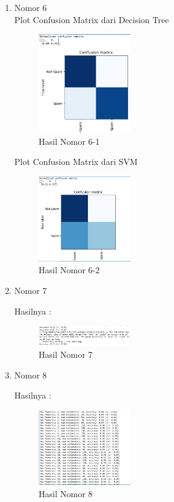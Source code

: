 \begin{enumerate}
\item Nomor 6\\
Plot Confusion Matrix dari Decision Tree
	\begin{figure}[H]
		\includegraphics[width=4cm]{figures/1174053/4/11.png}
		\centering
		\caption{Hasil Nomor 6-1}
	\end{figure}
	
Plot Confusion Matrix dari SVM
\begin{figure}[H]
		\includegraphics[width=4cm]{figures/1174053/4/12.png}
		\centering
		\caption{Hasil Nomor 6-2}
	\end{figure}
	
\item Nomor 7
\hfill\break
	
Hasilnya :
\hfill\break
	\begin{figure}[H]
		\includegraphics[width=4cm]{figures/1174053/4/13.png}
		\centering
		\caption{Hasil Nomor 7}
	\end{figure}
	
\item Nomor 8
\hfill\break
	
Hasilnya :
\hfill\break
	\begin{figure}[H]
		\includegraphics[width=4cm]{figures/1174053/4/14.png}
		\centering
		\caption{Hasil Nomor 8}
	\end{figure}
\end{enumerate}

